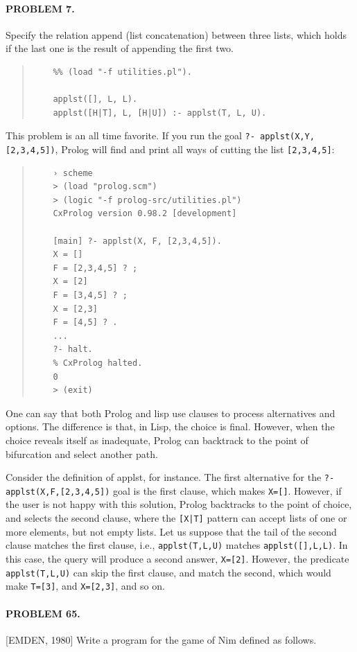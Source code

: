 \documentclass[a4paper,12pt]{book}
\begin{document}
\paragraph{PROBLEM 7.} Specify the relation append (list
concatenation) between three lists, which holds if the
last one is the result of appending the first two.
\begin{quote}
	\begin{verbatim}
	%% (load "-f utilities.pl").

	applst([], L, L).
	applst([H|T], L, [H|U]) :- applst(T, L, U).
	\end{verbatim}
\end{quote}

This problem is an all time favorite. If you run the
goal \verb|?- applst(X,Y,[2,3,4,5])|, Prolog will find and
print all ways of cutting the list \verb|[2,3,4,5]|:
\begin{quote}
	\begin{verbatim}
	› scheme
	> (load "prolog.scm")
	> (logic "-f prolog-src/utilities.pl")
	CxProlog version 0.98.2 [development]

	[main] ?- applst(X, F, [2,3,4,5]).
	X = []
	F = [2,3,4,5] ? ;
	X = [2]
	F = [3,4,5] ? ;
	X = [2,3]
	F = [4,5] ? .
	...
	?- halt.
	% CxProlog halted.
	0
	> (exit)
	\end{verbatim}
\end{quote}

One can say that both Prolog and lisp use clauses to
process alternatives and options. The difference is
that, in Lisp, the choice is final. However, when
the choice reveals itself as inadequate, Prolog can
backtrack to the point of bifurcation and select
another path.

Consider the definition of applst, for instance. The
first alternative for the \verb|?- applst(X,F,[2,3,4,5])|
goal is the first clause, which makes \verb|X=[]|.
However, if the user is not happy with this solution,
Prolog backtracks to the point of choice, and selects
the second clause, where the \verb/[X|T]/ pattern can
accept lists of one or more elements, but not empty
lists. Let us suppose that the tail of the second
clause matches the first clause, i.e., \verb|applst(T,L,U)|
matches \verb|applst([],L,L)|. In this case, the query
will produce a second answer, \verb|X=[2]|. However,
the predicate \verb|applst(T,L,U)| can skip the first
clause, and match the second, which would make
\verb|T=[3]|, and \verb|X=[2,3]|, and so on.

\paragraph{PROBLEM 65.} [EMDEN, 1980] Write a program for
the game of Nim defined as follows.
\end{document}
